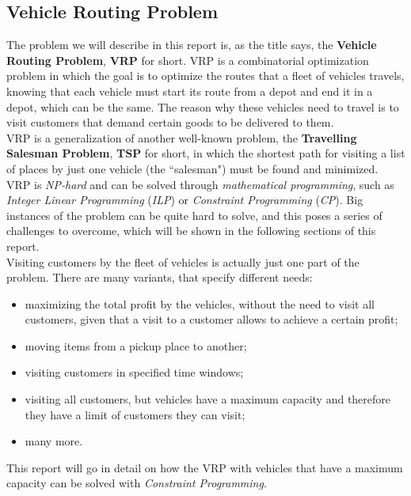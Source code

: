 \documentclass[../main.tex]{subfiles}
\begin{document}
\subsection{Vehicle Routing Problem}
\label{subsec:vehicle-routing-problem}
The problem we will describe in this report is, as the title says, the \textbf{Vehicle Routing Problem}, \textbf{VRP} for short.
VRP is a combinatorial optimization problem in which the goal is to optimize the routes that a fleet of vehicles travels, knowing that each vehicle must start its route
from a depot and end it in a depot, which can be the same. The reason why these vehicles need to travel is to visit customers that demand certain goods to be delivered to them.\\
VRP is a generalization of another well-known problem, the \textbf{Travelling Salesman Problem}, \textbf{TSP} for short, in which the shortest path for visiting a list of places by just one vehicle (the ``salesman") must be found and minimized.
VRP is \textit{NP-hard} and can be solved through \textit{mathematical programming}, such as \textit{Integer Linear Programming} (\textit{ILP}) or \textit{Constraint Programming} (\textit{CP}).
Big instances of the problem can be quite hard to solve, and this poses a series of challenges to overcome, which will be shown in the following sections of this report.\\
Visiting customers by the fleet of vehicles is actually just one part of the problem. There are many variants, that specify different needs:
\begin{itemize}
    \item maximizing the total profit by the vehicles, without the need to visit all customers, given that a visit to a customer allows to achieve a certain profit;
    \item moving items from a pickup place to another;
    \item visiting customers in specified time windows;
    \item visiting all customers, but vehicles have a maximum capacity and therefore they have a limit of customers they can visit;
    \item many more.
\end{itemize}
This report will go in detail on how the VRP with vehicles that have a maximum capacity can be solved with \textit{Constraint Programming}.
\end{document}
